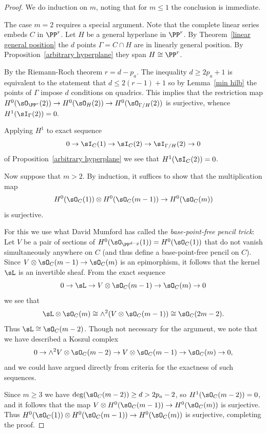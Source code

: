 \begin{proof} We do induction on $m$, noting that
for $m\leq 1$ the conclusion is immediate. 

The case $m=2$ requires a special argument. Note that the complete linear series
embeds $C$ in $\PP^{r}$.  Let $H$ be a general hyperlane in $\PP^{r}$.
 By Theorem~\ref{linear general position} the $d$ points $\Gamma = C\cap H$ are in linearly general position. By Proposition~\ref{arbitrary hyperplane} they span $H \cong \PP^{r}$.
 
By the Riemann-Roch theorem $r = d-p_a$. The inequality $d\geq 2p_a+1$ is equivalent to the statement that $d\leq 2(r-1)+1$ so by Lemma~\ref{min hilb} the points of $\Gamma$ impose $d$ conditions on quadrics.
This implies that
the restriction map $H^0(\sO_{\PP^{r}}(2))\to H^0(\sO_H(2)) \to H^0(\sO_{\Gamma/H}(2))$ is surjective, whence $H^1(\sI_\Gamma(2)) = 0.$

Applying $H^1$ to exact sequence 
$$
0\to \sI_C(1) \to \sI_C(2) \to \sI_{\Gamma/H}(2) \to 0
$$
of Proposition~\ref{arbitrary hyperplane}
we see that $H^1(\sI_C(2))=0$.

Now suppose that  $m>2$. By induction, it suffices to show that the multiplication map
$$
H^0(\sO_C(1)) \otimes H^0(\sO_C(m-1)) \to H^0(\sO_{C}(m))
$$
is surjective.

For this we use what David Mumford has called the \emph{base-point-free pencil trick}:
Let $V$ be a pair of sections of $H^0(\sO_{\PP^{d-g}}(1)) = H^0(\sO_C(1))$ that do not vanish simultaneously anywhere on $C$ (and thus define a base-point-free pencil on $C$).
Since $V\otimes \sO_{C}(m-1)\to \sO_{C}(m)$ is an epimorphism, it follows that the kernel $\sL$ is an invertible sheaf.
From the exact sequence
$$
0\to \sL \to V\otimes \sO_{C}(m-1) \to \sO_{C}(m) \to 0
$$
we see that
$$
\sL \otimes \sO_{C}(m) \cong  \wedge^2(V\otimes \sO_{C}(m-1))\cong \sO_C(2m-2).
$$
Thus $\sL \cong \sO_C(m-2)$.
Though not necessary for the argument, we note that we have described a Koszul complex
$$
0\to \wedge^2V \otimes \sO_C(m-2) \to V\otimes \sO_{C}(m-1)\to \sO_{C}(m)\to 0,
$$
and we could have argued directly from criteria for the exactness of such sequences.

Since $m\geq 3$ we have $\deg(\sO_C(m-2)) \geq d > 2p_a-2$, so $H^1(\sO_C(m-2)) =0$, and it follows that the map $V\otimes H^0(\sO_{C}(m-1))\to H^0(\sO_{C}(m))$
is surjective. Thus  
$H^0(\sO_C(1))\otimes H^0(\sO_{C}(m-1))\to H^0(\sO_{C}(m))$
is surjective, completing the proof.
\end{proof}


